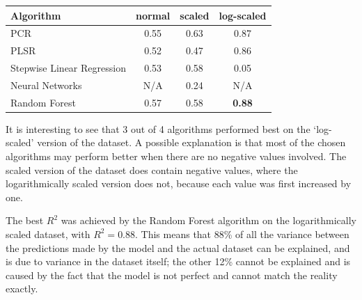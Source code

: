         \begin{center}
        \begin{tabular}[width=250pt]{|l|c|c|c|}

            \hline
            Algorithm                   & normal    & scaled   & log-scaled \\ \hline
            PCR                         &   0.55    & 0.63     & 0.87          \\
            PLSR                        &   0.52    & 0.47     & 0.86          \\
            Stepwise Linear Regression  &   0.53    & 0.58     & 0.05         \\
            Neural Networks             &   N/A     &   0.24   & N/A               \\
            Random Forest\footnotemark  &   0.57    & 0.58     & \textbf{0.88} \\
            \hline
        \end{tabular}
        \label{table:r-squared-table}
        \end{center}
        
        
        It is interesting to see that 3 out of 4 algorithms performed best on the `log-scaled' version of the dataset. A possible explanation is that most of the chosen algorithms may perform better when there are no negative values involved. The scaled version of the dataset does contain negative values, where the logarithmically scaled version does not, because each value was first increased by one.
        
        The best $R^2$ was achieved by the Random Forest algorithm on the logarithmically scaled dataset, with $R^2 = 0.88$. This means that 88\% of all the variance between the predictions made by the model and the actual dataset can be explained, and is due to variance in the dataset itself; the other 12\% cannot be explained and is caused by the fact that the model is not perfect and cannot match the reality exactly.
                
